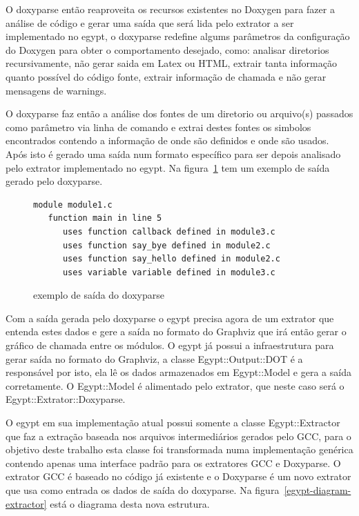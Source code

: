 O doxyparse então reaproveita os recursos existentes no Doxygen para fazer a
análise de código e gerar uma saída que será lida pelo extrator a ser
implementado no egypt, o doxyparse redefine algums parâmetros da configuração
do Doxygen para obter o comportamento desejado, como: analisar diretorios
recursivamente, não gerar saida em Latex ou HTML, extrair tanta informação
quanto possível do código fonte, extrair informação de chamada e não gerar
mensagens de warnings.

O doxyparse faz então a análise dos fontes de um diretorio ou arquivo(s)
passados como parâmetro via linha de comando e extrai destes fontes os simbolos
encontrados contendo a informação de onde são definidos e onde são usados. Após
isto é gerado uma saída num formato específico para ser depois analisado pelo
extrator implementado no egypt. Na figura~\ref{exemplo-saida-doxyparse} tem um
exemplo de saída gerado pelo doxyparse.

\begin{figure}[h]
\begin{Verbatim}[frame=single,fontsize=\relsize{-2},fontfamily=courier]
module module1.c
   function main in line 5
      uses function callback defined in module3.c
      uses function say_bye defined in module2.c
      uses function say_hello defined in module2.c
      uses variable variable defined in module3.c
\end{Verbatim}
\caption{exemplo de saída do doxyparse}
\label{exemplo-saida-doxyparse}
\end{figure}

Com a saída gerada pelo doxyparse o egypt precisa agora de um extrator que
entenda estes dados e gere a saída no formato do Graphviz que irá então gerar o
gráfico de chamada entre os módulos. O egypt já possui a infraestrutura
para gerar saída no formato do Graphviz, a classe Egypt::Output::DOT é a
responsável por isto, ela lê os dados armazenados em Egypt::Model e gera a
saída corretamente. O Egypt::Model é alimentado pelo extrator, que neste caso será
o Egypt::Extrator::Doxyparse.

O egypt em sua implementação atual possui somente a classe Egypt::Extractor que
faz a extração baseada nos arquivos intermediários gerados pelo GCC, para o
objetivo deste trabalho esta classe foi transformada numa implementação
genérica contendo apenas uma interface padrão para os extratores GCC e
Doxyparse. O extrator GCC é baseado no código já existente e o Doxyparse é um
novo extrator que usa como entrada os dados de saída do doxyparse. Na
figura~\ref{egypt-diagram-extractor} está o diagrama desta nova estrutura.

